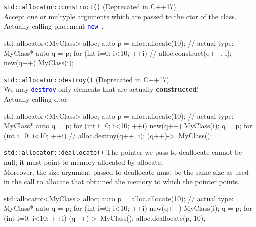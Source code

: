 \documentclass{beamer}
\newcommand{\blue}[1]{\textcolor{blue}{#1}}
\renewcommand{\bf}[1]{\textbf{#1}}
\newcommand{\ttt}[1]{\texttt{#1}}
\newcommand{\bluett}[1]{\blue{\ttt{#1}}}
\newcommand{\new}{\bluett{new}~}
\begin{document}
\begin{frame}[fragile]{\ttt{std::allocator::construct()}}
    (Deprecated in C++17)\\
    Accept one or multyple arguments which are passed to the ctor of the class.\\
    Actually calling placement \new.
    \begin{cpp}
        std::allocator<MyClass> alloc;
        auto p = alloc.allocate(10); // actual type: MyClass*
        auto q = p;
        for (int i=0; i<10; ++i){
            // alloc.construct(q++, i);
            new(q++) MyClass(i);
        }
    \end{cpp}
\end{frame}

\begin{frame}[fragile]{\ttt{std::allocator::destroy()}}
    (Deprecated in C++17)\\
    We may \bluett{destroy} only elements that are actually \bf{constructed}!\\
    Actually calling dtor.
    \begin{cpp}
        std::allocator<MyClass> alloc;
        auto p = alloc.allocate(10); // actual type: MyClass*
        auto q = p;
        for (int i=0; i<10; ++i)
            new(q++) MyClass(i);
        q = p;
        for (int i=0; i<10; ++i)
            // alloc.destroy(q++, i);
            (q++)->~MyClass();
    \end{cpp}
\end{frame}

\begin{frame}[fragile]{\ttt{std::allocator::deallocate()}}
    The pointer we pass to deallocate cannot be null; it must point to memory allocated by allocate.\\
    Moreover, the size argument passed to deallocate must be the same size as used in the call to allocate that obtained the memory to which the pointer points.
    \begin{cpp}
        std::allocator<MyClass> alloc;
        auto p = alloc.allocate(10); // actual type: MyClass*
        auto q = p;
        for (int i=0; i<10; ++i)
            new(q++) MyClass(i);
        q = p;
        for (int i=0; i<10; ++i)
            (q++)->~MyClass();
        alloc.deallocate(p, 10);
    \end{cpp}
\end{frame}
\end{document}

